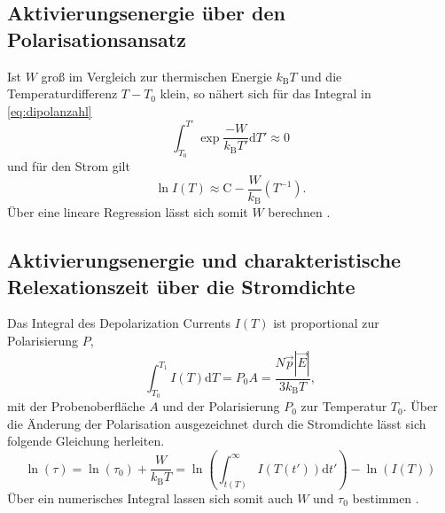 \subsection{Aktivierungsenergie über den Polarisationsansatz}

Ist $W$ groß im Vergleich zur thermischen Energie $k_\text{B}T$ und die Temperaturdifferenz $T - T_0$ klein, so nähert sich für das Integral in \autoref{eq:dipolanzahl}
\begin{equation*}
    \int_{T_0}^{T'} \exp{\frac{-W}{k_\text{B}T'} \mathrm{d}}T' \approx 0
\end{equation*}
und für den Strom gilt
\begin{equation}
    \ln{I\left(T\right)} \approx \text{C} - \frac{W}{k_\text{B}} \left(T^{-1}\right).
    \label{eq:fit_polarisationsansatz}
\end{equation}
Über eine lineare Regression lässt sich somit $W$ berechnen \cite{fuller}. 




\subsection{Aktivierungsenergie und charakteristische Relexationszeit über die Stromdichte}
Das Integral des Depolarization Currents $I(T)$ ist proportional zur Polarisierung $P$,
\begin{equation*}
    \int_{T_0}^{T_1} I\left(T\right) \mathrm{d}T = P_0 A = \frac{N \vec{p} \left\lvert \vec{E} \right\rvert}{3k_\text{B}T},
\end{equation*}
mit der Probenoberfläche $A$ und der Polarisierung $P_0$ zur Temperatur $T_0$. Über die Änderung der Polarisation 
ausgezeichnet durch die Stromdichte lässt sich folgende Gleichung herleiten.
\begin{equation}
    \ln\left(\tau\right) = \ln\left(\tau_0\right) + \frac{W}{k_\text{B}T} = \ln\left(\int_{t(T)}^{\infty} I(T(t'))\mathrm{d}t'\right) - \ln\left(I(T)\right)
    \label{eq:fit_stromdichtenansatz}
\end{equation}
Über ein numerisches Integral lassen sich somit auch $W$ und $\tau_0$ bestimmen \cite{fuller}.